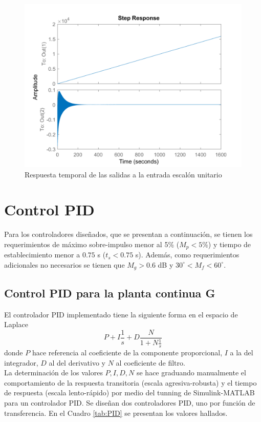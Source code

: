 \documentclass[journal]{IEEEtran}
\begin{document}
\begin{figure}[!h]
\caption{Respuesta temporal de las salidas a la entrada escalón unitario\label{fig:stepGdd}}
  \centering
\includegraphics[scale=0.18]{Bode/stepGdd.png}
\end{figure}



\section{Control PID}
Para los controladores diseñados, que se presentan a continuación, se tienen los requerimientos de máximo sobre-impulso menor al 5\% ($M_p<5\%$) y tiempo de establecimiento menor a $0.75$ s ($t_s<0.75$ s). Además, como requerimientos adicionales no necesarios se tienen que $M_g>0.6$ dB y $30^{\circ}<M_f<60^{\circ}$. 

\subsection*{Control PID para la planta continua G}
El controlador PID implementado tiene la siguiente forma en el espacio de Laplace
$$P+I\frac{1}{s}+D\frac{N}{1+N\frac{1}{s}}$$
donde $P$ hace referencia al coeficiente de la componente proporcional, $I$ a la del integrador, $D$ al del derivativo y $N$ al coeficiente de filtro.\\

La determinación de los valores $P,I,D,N$ se hace graduando manualmente el comportamiento de la respuesta transitoria (escala agresiva-robusta) y el tiempo de respuesta (escala lento-rápido) por medio del tunning de Simulink-MATLAB para un controlador PID. Se diseñan dos controladores PID, uno por función de transferencia. En el Cuadro \ref{tab:PID} se presentan los valores hallados.\\ 
\end{document}
